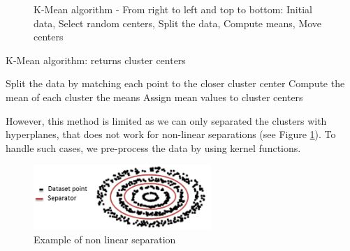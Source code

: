 \begin{figure}[h!]
\begin{center}
{}
\end{center}
\caption{K-Mean algorithm - From right to left and top to bottom: Initial data, Select random centers, Split the data, Compute means, Move centers}
\end{figure}
\begin{algorithm}
\caption{K-Mean algorithm: returns cluster centers}
\label{kmean}
\begin{algorithmic}
\Loop
\State Split the data by matching each point to the closer cluster center
\State Compute the mean of each cluster
\State \Return the means
\EndIf
\State Assign mean values to cluster centers 
\EndLoop
\end{algorithmic}
\end{algorithm}

However, this method is limited as we can only separated the clusters with hyperplanes, that does not work for non-linear separations (see Figure \ref{sepa}). To handle such cases, we pre-process the data by using kernel functions.
\begin{figure}
\includegraphics[width=0.6\textwidth]{Image/algo-sepa.png}\centering
\caption{Example of non linear separation\label{sepa}}
\end{figure}
